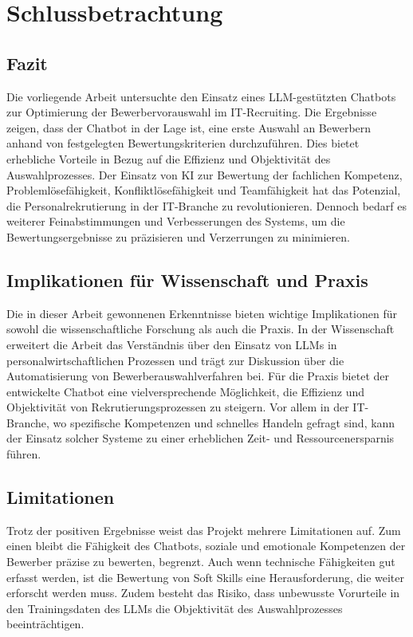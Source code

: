 
\chapter{Schlussbetrachtung}

\section{Fazit}

Die vorliegende Arbeit untersuchte den Einsatz eines LLM-gestützten Chatbots zur Optimierung der Bewerbervorauswahl im IT-Recruiting. Die Ergebnisse zeigen, dass der Chatbot in der Lage ist, eine erste Auswahl an Bewerbern anhand von festgelegten Bewertungskriterien durchzuführen. Dies bietet erhebliche Vorteile in Bezug auf die Effizienz und Objektivität des Auswahlprozesses. Der Einsatz von KI zur Bewertung der fachlichen Kompetenz, Problemlösefähigkeit, Konfliktlösefähigkeit und Teamfähigkeit hat das Potenzial, die Personalrekrutierung in der IT-Branche zu revolutionieren. Dennoch bedarf es weiterer Feinabstimmungen und Verbesserungen des Systems, um die Bewertungsergebnisse zu präzisieren und Verzerrungen zu minimieren.

\section{Implikationen für Wissenschaft und Praxis}

Die in dieser Arbeit gewonnenen Erkenntnisse bieten wichtige Implikationen für sowohl die wissenschaftliche Forschung als auch die Praxis. In der Wissenschaft erweitert die Arbeit das Verständnis über den Einsatz von LLMs in personalwirtschaftlichen Prozessen und trägt zur Diskussion über die Automatisierung von Bewerberauswahlverfahren bei. Für die Praxis bietet der entwickelte Chatbot eine vielversprechende Möglichkeit, die Effizienz und Objektivität von Rekrutierungsprozessen zu steigern. Vor allem in der IT-Branche, wo spezifische Kompetenzen und schnelles Handeln gefragt sind, kann der Einsatz solcher Systeme zu einer erheblichen Zeit- und Ressourcenersparnis führen.

\section{Limitationen}

Trotz der positiven Ergebnisse weist das Projekt mehrere Limitationen auf. Zum einen bleibt die Fähigkeit des Chatbots, soziale und emotionale Kompetenzen der Bewerber präzise zu bewerten, begrenzt. Auch wenn technische Fähigkeiten gut erfasst werden, ist die Bewertung von Soft Skills eine Herausforderung, die weiter erforscht werden muss. Zudem besteht das Risiko, dass unbewusste Vorurteile in den Trainingsdaten des LLMs die Objektivität des Auswahlprozesses beeinträchtigen.

